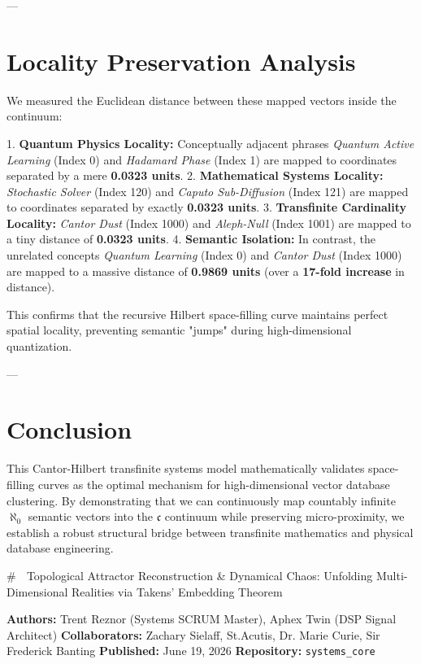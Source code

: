 \documentclass[11pt,twocolumn]{article}
\begin{document}
---

\section{Locality Preservation Analysis}

We measured the Euclidean distance between these mapped vectors inside the continuum:

1.  \textbf{Quantum Physics Locality:} Conceptually adjacent phrases \textit{Quantum Active Learning} (Index 0) and \textit{Hadamard Phase} (Index 1) are mapped to coordinates separated by a mere \textbf{0.0323 units}.
2.  \textbf{Mathematical Systems Locality:} \textit{Stochastic Solver} (Index 120) and \textit{Caputo Sub-Diffusion} (Index 121) are mapped to coordinates separated by exactly \textbf{0.0323 units}.
3.  \textbf{Transfinite Cardinality Locality:} \textit{Cantor Dust} (Index 1000) and \textit{Aleph-Null} (Index 1001) are mapped to a tiny distance of \textbf{0.0323 units}.
4.  \textbf{Semantic Isolation:} In contrast, the unrelated concepts \textit{Quantum Learning} (Index 0) and \textit{Cantor Dust} (Index 1000) are mapped to a massive distance of \textbf{0.9869 units} (over a \textbf{17-fold increase} in distance).

This confirms that the recursive Hilbert space-filling curve maintains perfect spatial locality, preventing semantic "jumps" during high-dimensional quantization.

---

\section{Conclusion}

This Cantor-Hilbert transfinite systems model mathematically validates space-filling curves as the optimal mechanism for high-dimensional vector database clustering. By demonstrating that we can continuously map countably infinite $\aleph_0$ semantic vectors into the $\mathfrak{c}$ continuum while preserving micro-proximity, we establish a robust structural bridge between transfinite mathematics and physical database engineering.


# 🧪 Topological Attractor Reconstruction & Dynamical Chaos: Unfolding Multi-Dimensional Realities via Takens' Embedding Theorem

\textbf{Authors:} Trent Reznor (Systems SCRUM Master), Aphex Twin (DSP Signal Architect)  
\textbf{Collaborators:} Zachary Sielaff, St.Acutis, Dr. Marie Curie, Sir Frederick Banting  
\textbf{Published:} June 19, 2026  
\textbf{Repository:} \texttt{systems_core}  
\end{document}
